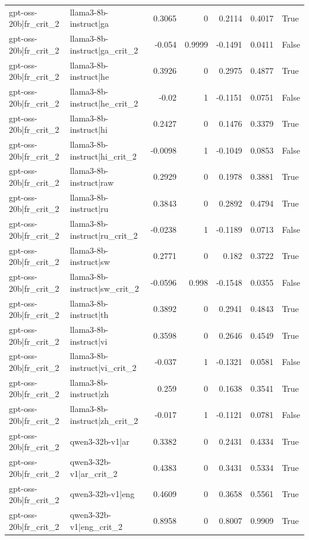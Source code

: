 \begin{table}
\begin{tabular}{l l r r r r l}
gpt-oss-20b|fr_crit_2 & llama3-8b-instruct|ga & 0.3065 & 0 & 0.2114 & 0.4017 & True \\
gpt-oss-20b|fr_crit_2 & llama3-8b-instruct|ga_crit_2 & -0.054 & 0.9999 & -0.1491 & 0.0411 & False \\
gpt-oss-20b|fr_crit_2 & llama3-8b-instruct|he & 0.3926 & 0 & 0.2975 & 0.4877 & True \\
gpt-oss-20b|fr_crit_2 & llama3-8b-instruct|he_crit_2 & -0.02 & 1 & -0.1151 & 0.0751 & False \\
gpt-oss-20b|fr_crit_2 & llama3-8b-instruct|hi & 0.2427 & 0 & 0.1476 & 0.3379 & True \\
gpt-oss-20b|fr_crit_2 & llama3-8b-instruct|hi_crit_2 & -0.0098 & 1 & -0.1049 & 0.0853 & False \\
gpt-oss-20b|fr_crit_2 & llama3-8b-instruct|raw & 0.2929 & 0 & 0.1978 & 0.3881 & True \\
gpt-oss-20b|fr_crit_2 & llama3-8b-instruct|ru & 0.3843 & 0 & 0.2892 & 0.4794 & True \\
gpt-oss-20b|fr_crit_2 & llama3-8b-instruct|ru_crit_2 & -0.0238 & 1 & -0.1189 & 0.0713 & False \\
gpt-oss-20b|fr_crit_2 & llama3-8b-instruct|sw & 0.2771 & 0 & 0.182 & 0.3722 & True \\
gpt-oss-20b|fr_crit_2 & llama3-8b-instruct|sw_crit_2 & -0.0596 & 0.998 & -0.1548 & 0.0355 & False \\
gpt-oss-20b|fr_crit_2 & llama3-8b-instruct|th & 0.3892 & 0 & 0.2941 & 0.4843 & True \\
gpt-oss-20b|fr_crit_2 & llama3-8b-instruct|vi & 0.3598 & 0 & 0.2646 & 0.4549 & True \\
gpt-oss-20b|fr_crit_2 & llama3-8b-instruct|vi_crit_2 & -0.037 & 1 & -0.1321 & 0.0581 & False \\
gpt-oss-20b|fr_crit_2 & llama3-8b-instruct|zh & 0.259 & 0 & 0.1638 & 0.3541 & True \\
gpt-oss-20b|fr_crit_2 & llama3-8b-instruct|zh_crit_2 & -0.017 & 1 & -0.1121 & 0.0781 & False \\
gpt-oss-20b|fr_crit_2 & qwen3-32b-v1|ar & 0.3382 & 0 & 0.2431 & 0.4334 & True \\
gpt-oss-20b|fr_crit_2 & qwen3-32b-v1|ar_crit_2 & 0.4383 & 0 & 0.3431 & 0.5334 & True \\
gpt-oss-20b|fr_crit_2 & qwen3-32b-v1|eng & 0.4609 & 0 & 0.3658 & 0.5561 & True \\
gpt-oss-20b|fr_crit_2 & qwen3-32b-v1|eng_crit_2 & 0.8958 & 0 & 0.8007 & 0.9909 & True \\

\end{tabular}
\end{table}
